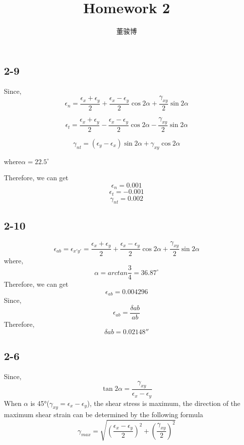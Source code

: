 \documentclass[onecolumn,oneside]{SUSTechHomework}
\author{董骏博}
\title{Homework 2}
\begin{document}
  \maketitle
  \subsection*{2-9}
  Since, 
   \[
   \epsilon_n = \frac{\epsilon_x + \epsilon_y}{2} + \frac{\epsilon_x - \epsilon_y}{2}  \cos2\alpha + \frac{\gamma_{xy}}{2} \sin 2\alpha
   \]
   
   \[
   \epsilon_t = \frac{\epsilon_x + \epsilon_y}{2} - \frac{\epsilon_x - \epsilon_y}{2}  \cos2\alpha - \frac{\gamma_{xy}}{2} \sin 2\alpha
   \]

   \[
   \gamma_{nt} = (\epsilon_y - \epsilon_x) \sin2\alpha + \gamma_{xy}\cos2\alpha
   \]

   where\(\alpha = 22.5^{\circ}\)

   Therefore, we can get 
   \[\epsilon_n = 0.001\]
   \[\epsilon_t = -0.001\]
   \[\gamma_{nt} = 0.002\]

  \subsection*{2-10}

  \[
    \epsilon_{ab} = \epsilon_{x' y'} = \frac{\epsilon_x + \epsilon_y}{2} + \frac{\epsilon_x - \epsilon_y}{2}  \cos2\alpha + \frac{\gamma_{xy}}{2} \sin 2\alpha
  \]
  where, \[\alpha = arctan\frac{3}{4} = 36.87^{\circ}\]
  Therefore, we can get \[\epsilon_{ab} = 0.004296\]
  Since, \[\epsilon_{ab} = \frac{\delta ab}{ab}\]
  Therefore, \[\delta ab = 0.02148'' \]

  \subsection*{2-6}
  Since, \[\tan2\alpha = \frac{\gamma_{xy}}{\epsilon_x - \epsilon_y}\]
  When \(\alpha\) is 45°(\(\gamma_{xy} = \epsilon_x - \epsilon_y\)), the shear stress is maximum, the direction of the maximum shear strain can be determined by the following formula
  \[\gamma_{max} = \sqrt{(\frac{\epsilon_x - \epsilon_y}{2})^2 + (\frac{\gamma_{xy}}{2})^2}\]
\end{document}
